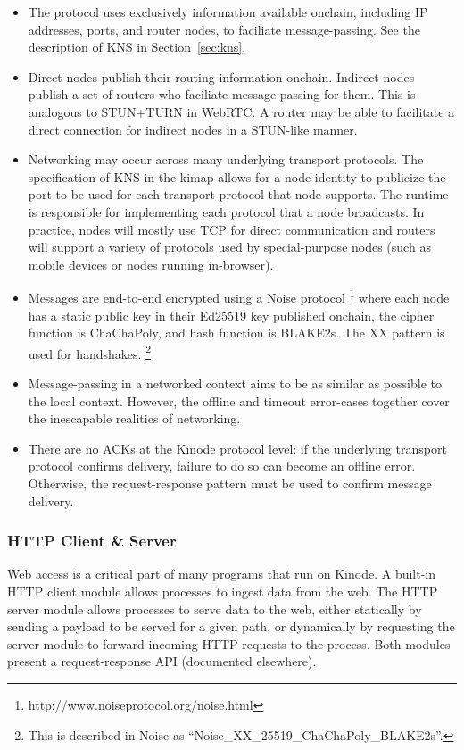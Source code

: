 \documentclass[runningheads]{llncs}
\begin{document}
\begin{itemize}
    \item The protocol uses exclusively information available onchain, including IP addresses, ports, and router nodes, to faciliate message-passing.
    See the description of KNS in Section~\ref{sec:kns}.
    \item Direct nodes publish their routing information onchain.
    Indirect nodes publish a set of routers who faciliate message-passing for them.
    This is analogous to STUN+TURN in WebRTC.
    A router may be able to facilitate a direct connection for indirect nodes in a STUN-like manner.
    \item Networking may occur across many underlying transport protocols.
    The specification of KNS in the kimap allows for a node identity to publicize the port to be used for each transport protocol that node supports.
    The runtime is responsible for implementing each protocol that a node broadcasts.
    In practice, nodes will mostly use TCP for direct communication and routers will support a variety of protocols used by special-purpose nodes (such as mobile devices or nodes running in-browser).
    \item Messages are end-to-end encrypted using a Noise protocol
    \footnote{http://www.noiseprotocol.org/noise.html}
    where each node has a static public key in their Ed25519 key published onchain, the cipher function is ChaChaPoly, and hash function is BLAKE2s.
    The XX pattern is used for handshakes.
    \footnote{This is described in Noise as ``Noise\_XX\_25519\_ChaChaPoly\_BLAKE2s''.}
    \item Message-passing in a networked context aims to be as similar as possible to the local context.
    However, the offline and timeout error-cases together cover the inescapable realities of networking.
    \item There are no ACKs at the Kinode protocol level: if the underlying transport protocol confirms delivery, failure to do so can become an offline error.
    Otherwise, the request-response pattern must be used to confirm message delivery.
\end{itemize}

\subsubsection{HTTP Client \& Server}
\label{sec:oshttp}

Web access is a critical part of many programs that run on Kinode.
A built-in HTTP client module allows processes to ingest data from the web.
The HTTP server module allows processes to serve data to the web, either statically by sending a payload to be served for a given path, or dynamically by requesting the server module to forward incoming HTTP requests to the process.
Both modules present a request-response API (documented elsewhere).
\end{document}
